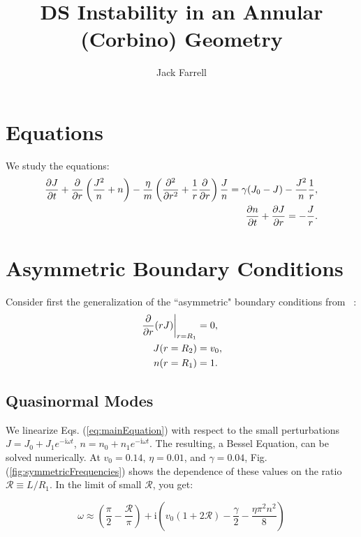 \documentclass[12pt]{article}
\title{DS Instability in an Annular (Corbino) Geometry}
\author{Jack Farrell}
\begin{document}
	\maketitle
	\section{Equations}
	We study the equations:
	\begin{equation}
	\label{eq:mainEquation}
	\begin{aligned}[c]
	\pdv{J}{t} + \pdv{r}\left(\frac{J^2}{n} + n \right) -\frac{\eta}{m} \left(\pdv[2]{r} + \frac{1}{r}\pdv{r}\right)\frac{J}{n} = \gamma (J_0 - J) - \frac{J^2}{n} \frac{1}{r},  \\
	\pdv{n}{t} + \pdv{J}{r} = -\frac{J}{r}. \\
	\end{aligned}
	\end{equation}
	\section{Asymmetric Boundary Conditions}
	Consider first the generalization of the ``asymmetric" boundary conditions from ~\cite{Mendl2019}:
	\begin{equation}
	\begin{aligned}
	\left.\pdv{r}(rJ)\right|_{r=R_1}&=0, \\
	J(r=R_2)&=v_0, \\
	n(r=R_1)&=1. \\
	\end{aligned}
	\end{equation}
	
	\subsection{Quasinormal Modes}
	We linearize Eqs. (\ref{eq:mainEquation}) with respect to the small perturbations $J=J_0 + J_1e^{-\mathrm{i}\omega t}$, $n = n_0+n_1e^{-\mathrm{i}\omega t}$.  The resulting, a Bessel Equation, can be solved numerically.  At $v_0 = 0.14$, $\eta=0.01$, and $\gamma = 0.04$, Fig. (\ref{fig:symmetricFrequencies}) shows the dependence of these values on the ratio $\mathcal{R}\equiv L/R_1$.  In the limit of small $\mathcal{R}$, you get:
	
	\begin{equation}
	\label{eq:analyticFreq}
	\omega \approx \left(\frac{\pi}{2}  -\frac{\mathcal{R}}{\pi}\right) + \mathrm{i}\left(v_0(1+2\mathcal{R}) - \frac{\gamma}{2} - \frac{\eta \pi^2 n^2}{8}\right)
	\end{equation}
	
\end{document}
